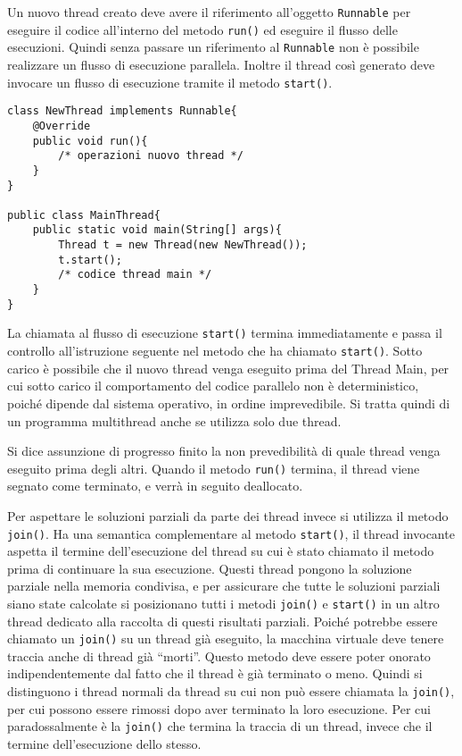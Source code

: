\documentclass{article}
\numberwithin{equation}{subsection}
\begin{document}
Un nuovo thread creato deve avere il riferimento all'oggetto \verb|Runnable| per eseguire il codice all'interno del metodo \verb|run()| ed eseguire il flusso delle 
esecuzioni. 
Quindi senza passare un riferimento al \verb|Runnable| non è possibile realizzare un flusso di esecuzione parallela. Inoltre il thread così generato deve invocare un 
flusso di esecuzione tramite il metodo \verb|start()|. 
\begin{verbatim}
class NewThread implements Runnable{
    @Override 
    public void run(){
        /* operazioni nuovo thread */
    }
}

public class MainThread{
    public static void main(String[] args){
        Thread t = new Thread(new NewThread());
        t.start();
        /* codice thread main */
    }
}
\end{verbatim}

La chiamata al flusso di esecuzione \verb|start()| termina immediatamente e passa il controllo all'istruzione seguente nel metodo che ha chiamato \verb|start()|. 
Sotto carico è possibile che il nuovo thread venga eseguito prima del Thread Main, per cui sotto carico il comportamento del codice parallelo non è deterministico, poiché 
dipende dal sistema operativo, in ordine imprevedibile. 
Si tratta quindi di un programma multithread anche se utilizza solo due thread. 

Si dice assunzione di progresso finito la non prevedibilità di quale thread venga eseguito prima degli altri. Quando il metodo \verb|run()| termina, il thread viene segnato 
come terminato, e verrà in seguito deallocato. 


Per aspettare le soluzioni parziali da parte dei thread invece si utilizza il metodo \verb|join()|. Ha una semantica complementare al metodo \verb|start()|, il thread 
invocante aspetta il termine dell'esecuzione del thread su cui è stato chiamato il metodo prima di continuare la sua esecuzione. 
Questi thread pongono la soluzione parziale nella memoria condivisa, e per assicurare che tutte le soluzioni parziali siano state calcolate si posizionano tutti i metodi 
\verb|join()| e \verb|start()| in un altro thread dedicato alla raccolta di questi risultati parziali. 
Poiché potrebbe essere chiamato un \verb|join()| su un thread già eseguito, la macchina virtuale deve tenere traccia anche di thread già ``morti''. Questo metodo deve 
essere poter onorato indipendentemente dal fatto che il thread è già terminato o meno. Quindi si distinguono i thread normali da thread su cui non può essere chiamata la \verb|join()|, 
per cui possono essere rimossi dopo aver terminato la loro esecuzione. 
Per cui paradossalmente è la \verb|join()| che termina la traccia di un thread, invece che il termine dell'esecuzione dello stesso. 
\end{document}
